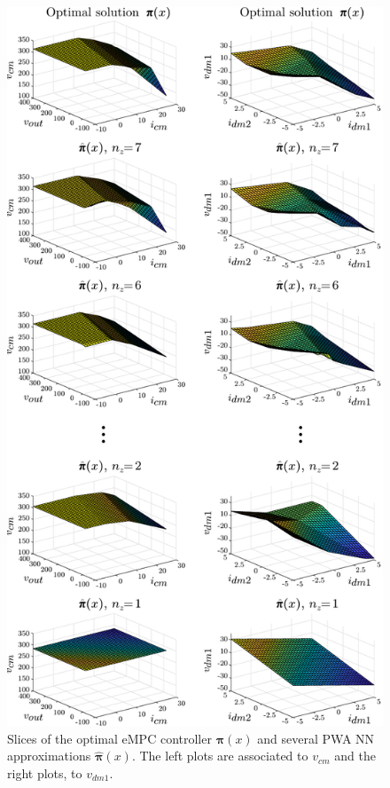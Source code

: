 \begin{figure}[h]
	\vspace{35pt}
	\begin{center}
		\includegraphics[scale=0.65]{../images/chap4_simres_surfs.pdf}    %
		\caption{Slices of the optimal eMPC controller $\bm{\pi}(x)$ and several PWA NN approximations $\hat{\bm{\pi}}(x)$. The left plots are associated to $v_{cm}$ and the right plots, to $v_{dm1}$.} 
		\label{fig:niceSlices}
	\end{center}
\end{figure}

